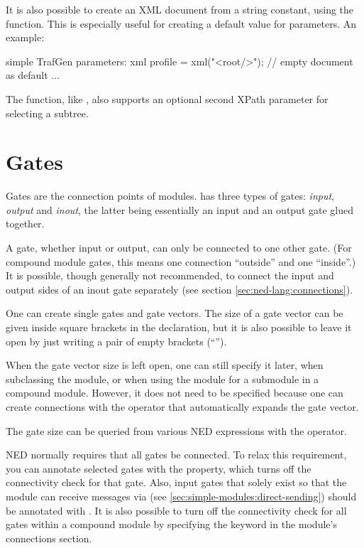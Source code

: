 It is also possible to create an XML document from a string constant, using
the  function. This is especially useful for creating a
default value for  parameters. An example:

\begin{ned}
simple TrafGen {
    parameters:
        xml profile = xml("<root/>"); // empty document as default
        ...
}
\end{ned}

The  function, like , also supports an
optional second XPath parameter for selecting a subtree.




\section{Gates}
\label{sec:ned-lang:gates}

Gates are the connection points of modules.  {\opp} has three types of
gates: \textit{input}, \textit{output} and \textit{inout}, the latter being
essentially an input and an output gate glued together.

A gate, whether input or output, can only be connected to one other
gate. (For compound module gates, this means one connection ``outside'' and
one ``inside''.)  It is possible, though generally not recommended, to
connect the input and output sides of an inout gate separately (see section
\ref{sec:ned-lang:connections}).

One can create single gates and gate vectors. The size of a gate vector
can be given inside square brackets in the declaration, but it is also possible
to leave it open by just writing a pair of empty brackets (``\ttt{[]}'').

When the gate vector size is left open, one can still specify it later,
when subclassing the module, or when using the module for a submodule in a
compound module. However, it does not need to be specified because
one can create connections with the  operator that
automatically expands the gate vector.

The gate size can be queried from various NED expressions with the
 operator.

NED normally requires that all gates be connected. To relax this
requirement, you can annotate selected gates with the 
property, which turns off the connectivity check for that gate. Also, input
gates that solely exist so that the module can receive messages via
 (see \ref{sec:simple-modules:direct-sending}) should
be annotated with . It is also possible to turn off the connectivity
check for all gates within a compound module by specifying the
 keyword in the module's connections section.

